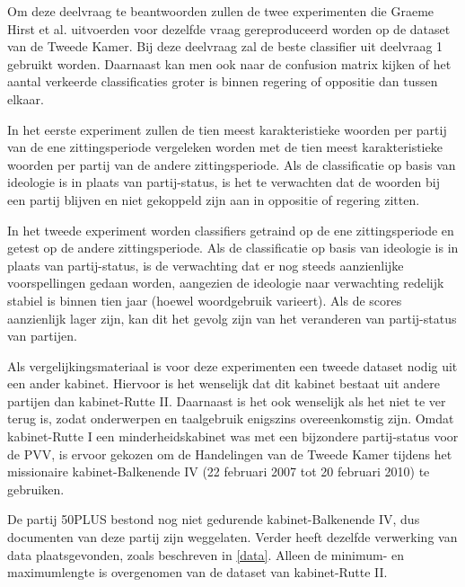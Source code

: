 Om deze deelvraag te beantwoorden zullen de twee experimenten die Graeme Hirst et al. uitvoerden voor dezelfde vraag gereproduceerd worden op de dataset van de Tweede Kamer. Bij deze deelvraag zal de beste classifier uit deelvraag 1 gebruikt worden. Daarnaast kan men ook naar de confusion matrix kijken of het aantal verkeerde classificaties groter is binnen regering of oppositie dan tussen elkaar.\par
In het eerste experiment zullen de tien meest karakteristieke woorden per partij van de ene zittingsperiode vergeleken worden met de tien meest karakteristieke woorden per partij van de andere zittingsperiode. Als de classificatie op basis van ideologie is in plaats van partij-status, is het te verwachten dat de woorden bij een partij blijven en niet gekoppeld zijn aan in oppositie of regering zitten. \par
In het tweede experiment worden classifiers getraind op de ene zittingsperiode en getest op de andere zittingsperiode. Als de classificatie op basis van ideologie is in plaats van partij-status, is de verwachting dat er nog steeds aanzienlijke voorspellingen gedaan worden, aangezien de ideologie naar verwachting redelijk stabiel is binnen tien jaar (hoewel woordgebruik varieert). Als de scores aanzienlijk lager zijn, kan dit het gevolg zijn van het veranderen van partij-status van partijen.\par
Als vergelijkingsmateriaal is voor deze experimenten een tweede dataset nodig uit een ander kabinet. Hiervoor is het wenselijk dat dit kabinet bestaat uit andere partijen dan kabinet-Rutte II. Daarnaast is het ook wenselijk als het niet te ver terug is, zodat onderwerpen en taalgebruik enigszins overeenkomstig zijn. Omdat kabinet-Rutte I een minderheidskabinet was met een bijzondere partij-status voor de PVV, is ervoor gekozen om de Handelingen van de Tweede Kamer tijdens het missionaire kabinet-Balkenende IV (22 februari 2007 tot 20 februari 2010) te gebruiken.\par
De partij 50PLUS bestond nog niet gedurende kabinet-Balkenende IV, dus documenten van deze partij zijn weggelaten. Verder heeft dezelfde verwerking van data plaatsgevonden, zoals beschreven in \ref{data}. Alleen de minimum- en maximumlengte is overgenomen van de dataset van kabinet-Rutte II.\par

